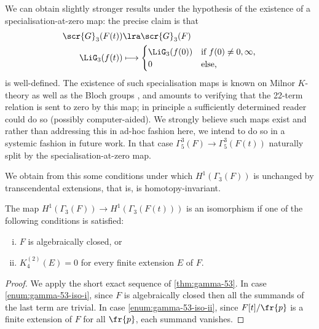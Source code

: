 \documentclass[a4paper]{amsart}
\begin{document}
\begin{remark}We can obtain slightly stronger results under the hypothesis of the existence of a specialisation-at-zero map: the precise claim is that
\begin{align*}\scr{G}_3(F(t)) &\lra \scr{G}_3(F) \\
\LiG_3(f(t)) &\longmapsto \begin{cases} \LiG_3(f(0)) & \text{if $f(0) \neq 0,\infty$,} \\
0 & \text{else,}\end{cases}\end{align*}
is well-defined. The existence of such specialisation maps is known on Milnor $K$-theory \cite[Theorem III.7.3]{Weibel} as well as the Bloch groups \cite[Section 3.2]{GoncharovEuler}, and amounts to verifying that the 22-term relation is sent to zero by this map; in principle a sufficiently determined reader could do so (possibly computer-aided). We strongly believe such maps exist and rather than addressing this in ad-hoc fashion here, we intend to do so in a systemic fashion in future work. In that case $\Gamma_5^3(F) \to \Gamma_5^3(F(t))$ naturally split by the specialisation-at-zero map.
\end{remark}

We obtain from this some conditions under which $H^1(\Gamma_3(F))$ is unchanged by transcendental extensions, that is, is homotopy-invariant.

\begin{corollary}\label{cor:gamma-53-iso} The map $H^1(\Gamma_3(F)) \to H^1(\Gamma_3(F(t)))$ is an isomorphism if one of the following conditions is satisfied:
\begin{enumerate}[(i)]
    \item \label{enum:gamma-53-iso-i} $F$ is algebraically closed, or
    \item \label{enum:gamma-53-iso-ii} $K_4^{(2)}(E) = 0$ for every finite extension $E$ of $F$.
\end{enumerate}
\end{corollary}

\begin{proof} We apply the short exact sequence of \cref{thm:gamma-53}. In case \eqref{enum:gamma-53-iso-i}, since $F$ is algebraically closed then all the summands of the last term are trivial. In case \eqref{enum:gamma-53-iso-ii}, since $F[t]/\fr{p}$ is a finite extension of $F$ for all $\fr{p}$, each summand vanishes.
\end{proof}
\end{document}

